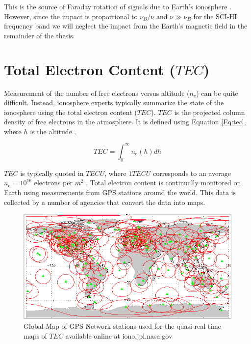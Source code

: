  This is the source of Faraday rotation of signals due to Earth's ionosphere \cite{thompson_2001}. However, since the impact is proportional to $\nu_B/\nu$ and $\nu \gg \nu_B$ for the SCI-HI frequency band we will neglect the impact from the Earth's magnetic field in the remainder of the thesis. 



\section{Total Electron Content ($TEC$)}

Measurement of the number of free electrons versus altitude ($n_e$) can be quite difficult. Instead, ionosphere experts typically summarize the state of the ionosphere using the total electron content ($TEC$). $TEC$ is the projected column density of free electrons in the atmosphere. It is defined using Equation \ref{Eq:tec}, where $h$ is the altitude \cite{thompson_2001}. 

\begin{equation} \label{Eq:tec}
TEC = \int_0^\infty n_e (h) dh 
\end{equation}

$TEC$ is typically quoted in $TECU$, where $1 TECU$ corresponds to an average $n_e = 10^{16}$ electrons per $m^2$ \cite{vedantham_2014}. Total electron content is continually monitored on Earth using measurements from GPS stations around the world. This data is collected by a number of agencies that convert the data into maps. 

\begin{figure}[htb]
\begin{center}
\includegraphics[width=0.95\linewidth]{Ionosphere/figures/gps_sitemap.png}
\caption{Global Map of GPS Network stations used for the quasi-real time maps of $TEC$ available online at iono.jpl.nasa.gov}
\label{Fig:gps_stat}
\end{center}
\end{figure}

